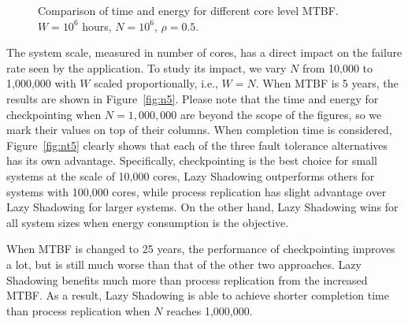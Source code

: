 \begin{figure}[!t]
	\captionsetup{justification=centering}
	\begin{center} 
		\caption{Comparison of time and energy for different core level MTBF. $W=10^6$ hours, $N=10^6$, $\rho=0.5$.}
	\end{center}
	\label{fig:com3}
\end{figure}

The system scale, measured in number of cores, has a direct impact on the failure rate seen by the application. To study its impact, we vary $N$ from 10,000 to 1,000,000 with $W$ scaled proportionally, i.e., $W=N$. When MTBF is 5 years, the results are shown in Figure~\ref{fig:n5}. Please note that the time and energy for checkpointing when $N=1,000,000$ are beyond the scope of the figures, so we mark their values on top of their columns. When completion time is considered, Figure~\ref{fig:nt5} clearly shows that each of the three fault tolerance alternatives has its own advantage. Specifically, checkpointing is the best choice for small systems at the scale of 10,000 cores, Lazy Shadowing outperforms others for systems with 100,000 cores, while process replication has slight advantage over Lazy Shadowing for larger systems. On the other hand, Lazy Shadowing wins for all system sizes when energy consumption is the objective. 

When MTBF is changed to 25 years, the performance of checkpointing improves a lot, but is still much worse than that of the other two approaches. Lazy Shadowing benefits much more than process replication from the increased MTBF. As a result, Lazy Shadowing is able to achieve shorter completion time than process replication when $N$ reaches 1,000,000.

